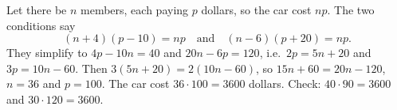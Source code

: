 Let there be $n$ members, each paying $p$ dollars, so the car cost $np$. The two conditions say
\[
(n+4)(p-10)=np\quad\text{and}\quad(n-6)(p+20)=np .
\]
They simplify to $4p-10n=40$ and $20n-6p=120$, i.e.\ $2p=5n+20$ and $3p=10n-60$. Then $3(5n+20)=2(10n-60)$, so $15n+60=20n-120$, $n=36$ and $p=100$. The car cost $36\cdot100=\boxed{3600}$ dollars. Check: $40\cdot90=3600$ and $30\cdot120=3600$.
